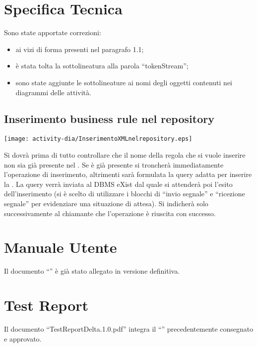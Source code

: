 \section{Specifica Tecnica}
Sono state apportate correzioni:
\begin{itemize}
\item ai vizi di forma presenti nel paragrafo 1.1;
\item \`e stata tolta la sottolineatura alla parola ``tokenStream'';
\item sono state aggiunte le sottolineature ai nomi degli oggetti contenuti nei diagrammi delle attivit\`a.
\end{itemize}
\begin{center} 
\subsection{Inserimento business rule nel repository}
\texttt{[image: activity-dia/InserimentoXMLnelrepository.eps]}
\end{center}
Si dovr\`a prima di tutto controllare che il nome della regola che si vuole inserire non sia gi\`a presente nel \rp. Se \`e gi\`a presente si troncher\`a immediatamente l'operazione di inserimento, altrimenti sar\`a formulata la query adatta per inserire la \br . La query verr\`a inviata al DBMS eXist dal quale si attender\`a poi l'esito dell'inserimento (si \`e scelto di utilizzare i blocchi di ``invio segnale'' e ``ricezione segnale'' per evidenziare una situazione di attesa). Si indicher\`a solo successivamente al chiamante che l'operazione \`e riuscita con successo.
\section{Manuale Utente}
Il documento ``\MU'' \`e gi\`a stato allegato in versione definitiva.
\section{Test Report}
Il documento ``TestReportDelta.1.0.pdf'' integra il ``\TR'' precedentemente consegnato e approvato.
